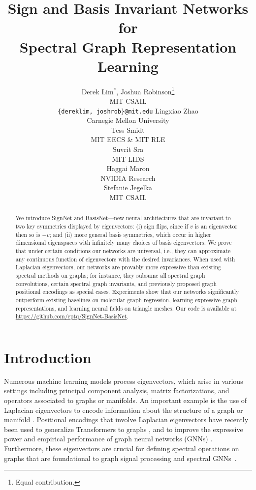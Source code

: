 \documentclass{article} \usepackage{iclr2023_conference,times}
\title{Sign and Basis Invariant Networks for\\ Spectral Graph Representation Learning}
\author{Derek Lim$^{*}$, Joshua Robinson\thanks{Equal contribution.}\\
MIT CSAIL\\
\texttt{\{dereklim, joshrob\}@mit.edu}
\And Lingxiao Zhao  \\
Carnegie Mellon University\\
\And Tess Smidt\\
MIT EECS \& MIT RLE\\
\And
Suvrit Sra \\
MIT LIDS\\
\And
Haggai Maron \\
NVIDIA Research \\
\And Stefanie Jegelka \\
MIT CSAIL
}
\begin{document}
\maketitle

\begin{abstract}
We introduce SignNet and BasisNet---new neural architectures that are invariant to two key symmetries displayed by eigenvectors: (i) sign flips, since if $v$ is an eigenvector then so is $-v$; and (ii) more general basis symmetries, which occur in higher dimensional eigenspaces with infinitely many choices of basis eigenvectors. We prove that under certain conditions our networks are universal, i.e., they can approximate any continuous function of eigenvectors with the desired invariances. 
When used with Laplacian eigenvectors, our networks are provably more expressive than existing spectral methods on graphs; for instance, they subsume all spectral graph convolutions, certain spectral graph invariants, and previously proposed graph positional encodings as special cases.
Experiments show that our networks significantly outperform existing baselines on molecular graph regression, learning expressive graph representations, and learning neural fields on triangle meshes.
Our code is available at 
\url{https://github.com/cptq/SignNet-BasisNet}.
\end{abstract}

\section{Introduction}


Numerous machine learning models process eigenvectors, which arise in various settings including principal component analysis, matrix factorizations, and operators associated to graphs or manifolds. An important example is the use of  Laplacian eigenvectors to encode information about the structure of a graph or manifold \citep{belkin2003laplacian,von2007tutorial,levy2006laplace}.
Positional encodings that involve Laplacian eigenvectors have recently been used to generalize Transformers to graphs \citep{kreuzer2021rethinking,dwivedi2020generalization}, and to improve the expressive power and empirical performance of graph neural networks (GNNs) \citep{dwivedi2022graph}. Furthermore, these eigenvectors are crucial for defining spectral operations on graphs that are foundational to graph signal processing and spectral GNNs~\citep{ortega2018graph, bruna2014spectral}.
\end{document}
